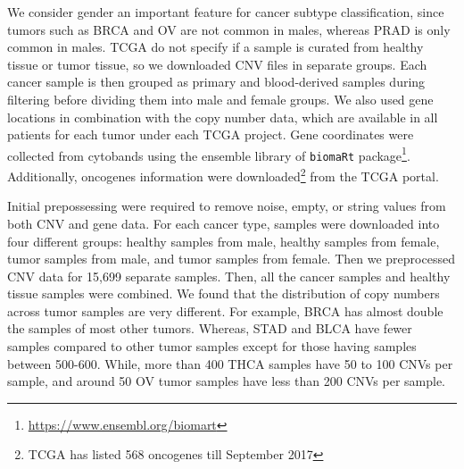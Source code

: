 \fi 

\hspace*{3.5mm} We consider gender an important feature for cancer subtype classification, since tumors such as {BRCA} and {OV} are not common in males, whereas {PRAD} is only common in males. TCGA do not specify if a sample is curated from healthy tissue or tumor tissue, so we downloaded CNV files in separate groups. Each cancer sample is then grouped as primary and blood-derived samples during filtering before dividing them into male and female groups. We also used gene locations in combination with the copy number data, which are available in all patients for each tumor under each TCGA project. Gene coordinates were collected from cytobands using the ensemble library of \texttt{biomaRt} package\footnote{\url{https://www.ensembl.org/biomart}}. Additionally, oncogenes information were downloaded\footnote{TCGA has listed 568 oncogenes till September 2017} from the TCGA portal. 

\hspace*{3.5mm} Initial prepossessing were required to remove noise, empty, or string values from both CNV and gene data. For each cancer type, samples were downloaded into four different groups: healthy samples from male, healthy samples from female, tumor samples from male, and tumor samples from female. Then we preprocessed CNV data for 15,699 separate samples. Then, all the cancer samples and healthy tissue samples were combined. We found that the distribution of copy numbers across tumor samples are very different. For example, BRCA has almost double the samples of most other tumors. Whereas, {STAD} and {BLCA} have fewer samples compared to other tumor samples except for those having samples between 500-600. While, more than 400 THCA samples have 50 to 100 CNVs per sample, and around 50 OV tumor samples have less than 200 CNVs per sample. 

